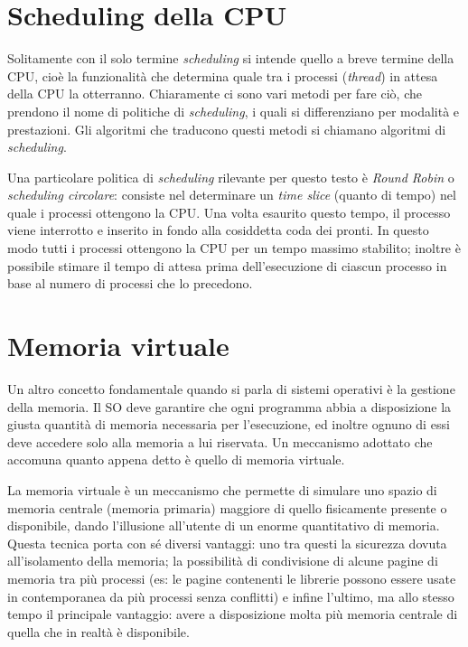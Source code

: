\section{Scheduling della CPU}
Solitamente con il solo termine \textit{scheduling} si intende quello a breve termine della CPU, cioè la funzionalità che determina quale tra i processi (\textit{thread}) in attesa della CPU la otterranno. Chiaramente ci sono vari metodi per fare ciò, che prendono il nome di politiche di \textit{scheduling}, i quali si differenziano per modalità e prestazioni. Gli algoritmi che traducono questi metodi si chiamano algoritmi di \textit{scheduling}.

Una particolare politica di \textit{scheduling} rilevante per questo testo è \textit{Round Robin} o \textit{scheduling circolare}: consiste nel determinare un \textit{time slice} (quanto di tempo) nel quale i processi ottengono la CPU. Una volta esaurito questo tempo, il processo viene interrotto e inserito in fondo alla cosiddetta coda dei pronti. In questo modo tutti i processi ottengono la CPU per un tempo massimo stabilito; inoltre è possibile stimare il tempo di attesa prima dell'esecuzione di ciascun processo in base al numero di processi che lo precedono.

\section{Memoria virtuale}
Un altro concetto fondamentale quando si parla di sistemi operativi è la gestione della memoria. Il SO deve garantire che ogni programma abbia a disposizione la giusta quantità di memoria necessaria per l'esecuzione, ed inoltre ognuno di essi deve accedere solo alla memoria a lui riservata. Un meccanismo adottato che accomuna quanto appena detto è quello di memoria virtuale.

La memoria virtuale è un meccanismo che permette di simulare uno spazio di memoria centrale (memoria primaria) maggiore di quello fisicamente presente o disponibile, dando l'illusione all'utente di un enorme quantitativo di memoria. Questa tecnica porta con sé diversi vantaggi: uno tra questi la sicurezza dovuta all'isolamento della memoria; la possibilità di condivisione di alcune pagine di memoria tra più processi (es: le pagine contenenti le librerie possono essere usate in contemporanea da più processi senza conflitti) e infine l'ultimo, ma allo stesso tempo il principale vantaggio: avere a disposizione molta più memoria centrale di quella che in realtà è disponibile. 

